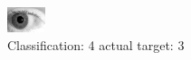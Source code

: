 \begin{figure}[h!]
\begin{center}
\includegraphics[width=0.60\columnwidth]{figures/ID295_class_4_target_3.png}
\end{center}
\caption{ Classification: 4 actual target: 3}
\label{fig:ID295_class_4_target_3}
\end{figure}
